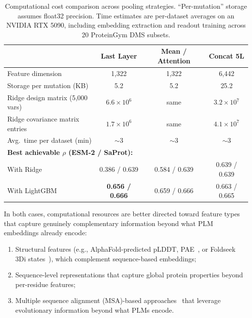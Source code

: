 \documentclass[11pt,a4paper]{article}
\begin{document}
\begin{table}[ht]
\centering
\caption{Computational cost comparison across pooling strategies.
``Per-mutation'' storage assumes float32 precision. Time estimates are
per-dataset averages on an NVIDIA RTX 5090, including embedding extraction
and readout training across 20 ProteinGym DMS subsets.}
\label{tab:cost}
\begin{tabular}{lccc}
\toprule
& Last Layer & Mean / Attention & Concat 5L \\
\midrule
Feature dimension                  & 1,322 & 1,322 & 6,442 \\
Storage per mutation (KB)          & 5.2   & 5.2   & 25.2 \\
Ridge design matrix (5,000 vars)   & $6.6 \times 10^6$ & same & $3.2 \times 10^7$ \\
Ridge covariance matrix entries    & $1.7 \times 10^6$ & same & $4.1 \times 10^7$ \\
Avg.\ time per dataset (min)       & $\sim$3 & $\sim$3 & $\sim$3 \\
\midrule
\multicolumn{4}{l}{\small \textbf{Best achievable $\rho$ (ESM-2 / SaProt):}} \\
\quad With Ridge                    & 0.386 / 0.639 & 0.584 / 0.639 & 0.639 / 0.639 \\
\quad With LightGBM                 & \textbf{0.656 / 0.666} & 0.659 / 0.666 & 0.663 / 0.665 \\
\bottomrule
\end{tabular}
\end{table}

In both cases, computational resources are better directed toward feature types
that capture genuinely complementary information beyond what PLM embeddings
already encode:
\begin{enumerate}
    \item Structural features (e.g., AlphaFold-predicted pLDDT, PAE~\cite{jumper2021alphafold},
          or Foldseek 3Di states~\cite{vankempen2024foldseek}), which complement
          sequence-based embeddings;
    \item Sequence-level representations that capture global protein properties
          beyond per-residue features;
    \item Multiple sequence alignment (MSA)-based approaches~\cite{riesselman2018deepsequence,
          hopf2017mutation} that leverage evolutionary information beyond what PLMs encode.
\end{enumerate}
\end{document}

